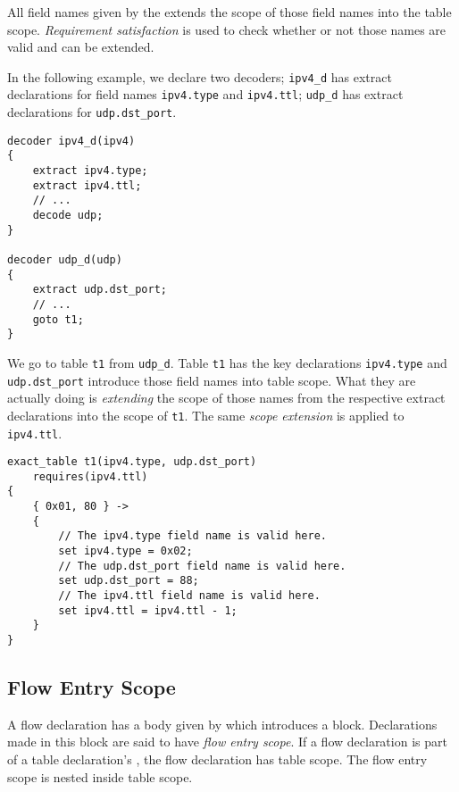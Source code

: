 All field names given by the  extends the scope of those field names into the table scope. \textit{Requirement satisfaction} is used to check whether or not those names are valid and can be extended.

In the following example, we declare two decoders; \texttt{ipv4\_d} has extract declarations for field names \texttt{ipv4.type} and \texttt{ipv4.ttl}; \texttt{udp\_d} has extract declarations for \texttt{udp.dst\_port}.

\begin{minip}
\begin{lstlisting}
decoder ipv4_d(ipv4)
{
	extract ipv4.type;
	extract ipv4.ttl;
	// ...
	decode udp;
}

decoder udp_d(udp)
{
	extract udp.dst_port;
	// ...
	goto t1;
}
\end{lstlisting}
\end{minip}

We go to table \texttt{t1} from \texttt{udp\_d}. Table \texttt{t1} has the key declarations \texttt{ipv4.type} and \texttt{udp.dst\_port} introduce those field names into table scope. What they are actually doing is \textit{extending} the scope of those names from the respective extract declarations into the scope of \texttt{t1}. The same \textit{scope extension} is applied to \texttt{ipv4.ttl}.

\begin{minip}
\begin{lstlisting}
exact_table t1(ipv4.type, udp.dst_port)
	requires(ipv4.ttl)
{
	{ 0x01, 80 } ->
	{
		// The ipv4.type field name is valid here.
		set ipv4.type = 0x02;
		// The udp.dst_port field name is valid here.
		set udp.dst_port = 88;
		// The ipv4.ttl field name is valid here.
		set ipv4.ttl = ipv4.ttl - 1;
	}
}
\end{lstlisting}
\end{minip}

\subsection{Flow Entry Scope} \label{flow_scope}

A flow declaration has a body given by  which introduces a block. Declarations made in this block are said to have \textit{flow entry scope}. If a flow declaration is part of a table declaration's , the flow declaration has table scope. The flow entry scope is nested inside table scope.

